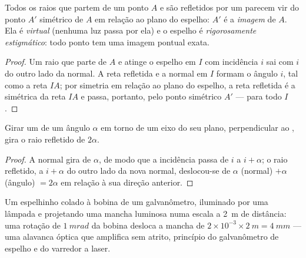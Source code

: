\begin{proposition}\label{prop:b1:rays-reflection-refraction:mirror}
Todos os raios que partem de um ponto $A$ e são refletidos por um  parecem vir
do ponto $A'$ simétrico de $A$ em relação ao plano do espelho: $A'$
é a \emph{imagem} de $A$. Ela é \emph{virtual} (nenhuma luz passa por
ela) e o espelho é \emph{rigorosamente estigmático}: todo ponto tem uma
imagem pontual exata.
\end{proposition}

\begin{proof}
Um raio que parte de $A$ e atinge o espelho em $I$ com incidência $i$ sai com
$i$ do outro lado da normal. A reta refletida e a normal
em $I$ formam o ângulo $i$, tal como a reta $IA$; por simetria em relação
ao plano do espelho, a reta refletida é a simétrica da
reta $IA$ e passa, portanto, pelo ponto simétrico $A'$ --- para todo
$I$.
\end{proof}

\begin{proposition}\label{prop:b1:rays-reflection-refraction:rotation}
Girar um  de um ângulo $\alpha$ em torno de um eixo do seu plano,
perpendicular ao , gira o raio refletido de
$2\alpha$.
\end{proposition}

\begin{proof}
A normal gira de $\alpha$, de modo que a incidência passa de $i$ a
$i + \alpha$; o raio refletido, a $i + \alpha$ do outro lado da
nova normal, deslocou-se de $\alpha$ (normal) $+ \alpha$ (ângulo) $=
2\alpha$ em relação à sua direção anterior.
\end{proof}

\begin{example}\label{ex:b1:rays-reflection-refraction:galvanometer}
Um espelhinho colado à bobina de um galvanômetro, iluminado por uma lâmpada e
projetando uma mancha luminosa numa escala a \qty{2}{m} de distância: uma rotação de
$\qty{1}{mrad}$ da bobina desloca a mancha de $2 \times 10^{-3} \times
\qty{2}{m} = \qty{4}{mm}$ --- uma alavanca óptica que amplifica sem
atrito, princípio do galvanômetro de espelho e do
varredor a laser.
\end{example}

